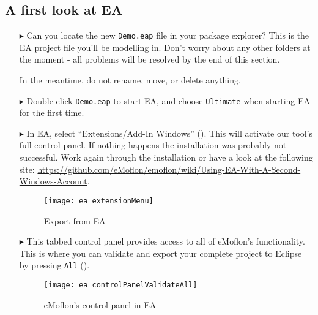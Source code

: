 \clearpage
\genHeader

\subsection{A first look at EA}

\begin{itemize}
\FloatBarrier
\hypertarget{simpleDemo vis}{}
\item[$\blacktriangleright$] Can you locate the new \texttt{Demo.eap} file in your package explorer? This is the EA project file you'll be
modelling in. Don't worry about any other folders at the moment - all problems will be resolved by the end of this section.

In the meantime, do not rename, move, or delete anything.

\item[$\blacktriangleright$] Double-click \texttt{Demo.eap} to start EA, and choose \texttt{Ultimate} when starting EA for the first time.

\item[$\blacktriangleright$] In EA, select ``Extensions/Add-In Windows'' (). This will activate our tool's full
control panel. If nothing happens the installation was probably not successful. Work again through the installation or have a look at the following site:
\newline
\href{https://github.com/eMoflon/emoflon/wiki/Using-EA-With-A-Second-Windows-Account}{https://github.com/eMoflon/emoflon/wiki/Using-EA-With-A-Second-Windows-Account}.

\vspace{0.5cm}

\begin{figure}[htbp]
	\centering
  \texttt{[image: ea\_extensionMenu]}
	\caption{Export from EA} 
	\label{ea:validate_dropdown} 
\end{figure}

\item[$\blacktriangleright$] This tabbed control panel provides access to all of
eMoflon's functionality. This is where you can validate and export your complete project to Eclipse by pressing \texttt{All} ().

\begin{figure}[htbp]
	\centering
  \texttt{[image: ea\_controlPanelValidateAll]}
	\caption{eMoflon's control panel in EA} 
	\label{ea:controlPanel} 
\end{figure}


\end{itemize}
